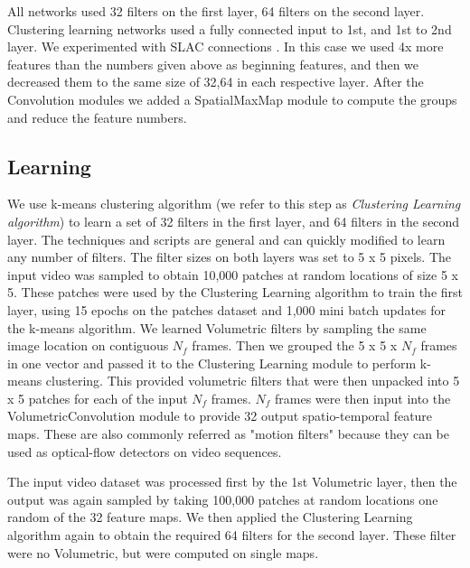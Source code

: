 \documentclass{article} %
\begin{document}
All networks used 32 filters on the first layer, 64 filters on the second layer. Clustering learning networks used a fully connected input to 1st, and 1st to 2nd layer. We experimented with SLAC connections \cite{}. In this case we used 4x more features than the numbers given above as beginning features, and then we decreased them to the same size of 32,64 in each respective layer. After the Convolution modules we added a SpatialMaxMap module to compute the groups and reduce the feature numbers.



\subsection{Learning}
We use k-means clustering algorithm (we refer to this step as \textit{Clustering Learning algorithm}) to learn a set of 32 filters in the first layer, and 64 filters in the second layer. The techniques and scripts are general and can quickly modified to learn any number of filters. The filter sizes on both layers was set to 5 x 5 pixels.
The input video was sampled to obtain 10,000 patches at random locations of size 5 x 5. These patches were used by the Clustering Learning algorithm to train the first layer, using 15 epochs on the patches dataset and 1,000 mini batch updates for the k-means algorithm. We learned Volumetric filters by sampling the same image location on contiguous $N_f$ frames. Then we grouped the 5 x 5 x $N_f$ frames in one vector and passed it to the Clustering Learning module to perform k-means clustering. This provided volumetric filters that were then unpacked into 5 x 5 patches for each of the input $N_f$ frames. $N_f$ frames were then input into the VolumetricConvolution module to provide 32 output spatio-temporal feature maps. These are also commonly referred as "motion filters" because they can be used as optical-flow detectors on video sequences.

The input video dataset was processed first by the 1st Volumetric layer, then the output was again sampled by taking 100,000 patches at random locations one random of the 32 feature maps. We then applied the Clustering Learning algorithm again to obtain the required 64 filters for the second layer. These filter were no Volumetric, but were computed on single maps. 
\end{document}
